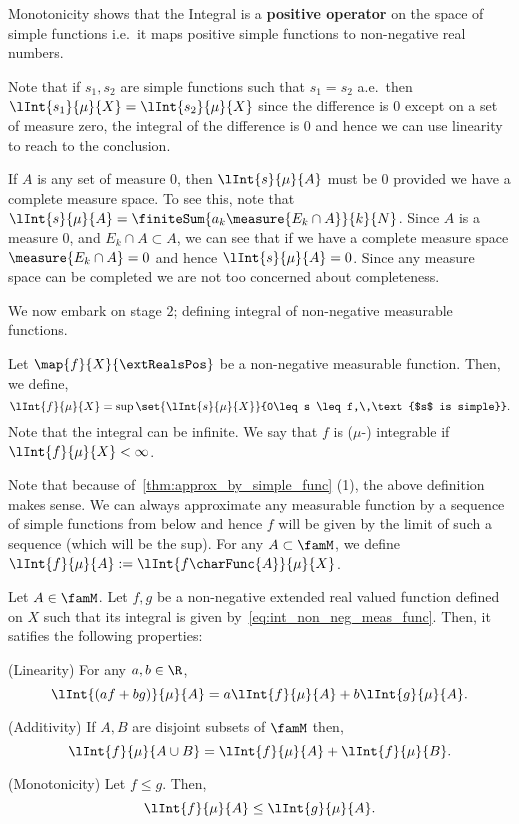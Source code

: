 Monotonicity shows that the Integral is a \textbf{positive operator} on the space of simple functions i.e.~it
maps positive simple functions to non-negative real numbers. 
\begin{Remark}\label{rmk:simple_func_meas_0}
    Note that if $s_1,s_2$ are simple functions such that $s_1 = s_2$ a.e.~then $\lInt{s_1}{\mu}{X} =
    \lInt{s_2}{\mu}{X}$ since the difference is $0$ except on a set of measure zero, 
    the integral of the difference is
    $0$ and hence we can use linearity to reach to the conclusion.

    If $A$ is any set of measure $0$, then $\lInt{s}{\mu}{A}$ must be $0$ provided we have a complete measure
    space. To see this, note that $\lInt{s}{\mu}{A} = \finiteSum{a_k\measure{E_k\cap A}}{k}{N}$. Since $A$ is
    a measure $0$, and $E_k \cap A \subset A$, we can see that if we have a complete measure space
    $\measure{E_k\cap A} = 0$ and hence $\lInt{s}{\mu}{A} = 0$. Since any measure space can be completed we
    are not too concerned about completeness.
\end{Remark}
We now embark on stage $2$; defining integral of non-negative measurable functions.
\begin{Definition}
    Let $\map{f}{X}{\extRealsPos}$ be a non-negative measurable function. Then, we define,
    \begin{equation}\label{eq:int_non_neg_meas_func}
	\lInt{f}{\mu}{X} = \sup\set{\lInt{s}{\mu}{X}}{0\leq s \leq f,\,\text{$s$ is simple}}.
    \end{equation}
    Note that the integral can be infinite. 
    We say that $f$ is ($\mu$-) integrable if $\lInt{f}{\mu}{X} < \infty$.
\end{Definition}
Note that because of~\ref{thm:approx_by_simple_func} (1), the above definition makes sense. We can always
approximate any measurable function by a sequence of simple functions from below and hence $f$ will be given
by the limit of such a sequence (which will be the sup).
For any $A \subset \famM$, we define\break{} 
$\lInt{f}{\mu}{A} := \lInt{f\charFunc{A}}{\mu}{X}$. 
\begin{Proposition}[name=Properties of the integral of non-negative measurable function]
    Let $A \in \famM$. Let $f,g$ be a non-negative extended real valued function defined on $X$ 
    such that its integral is given
    by~\ref{eq:int_non_neg_meas_func}. Then, it satifies the following properties:
    \begin{properties}
    \item
	(Linearity) For any $a,b \in \R$, 
	\[\lInt{(af + bg)}{\mu}{A} = a\lInt{f}{\mu}{A} + b\lInt{g}{\mu}{A}.\]
    \item
	(Additivity) If $A,B$ are disjoint subsets of $\famM$ then,
	\[\lInt{f}{\mu}{A\cup B} = \lInt{f}{\mu}{A} + \lInt{f}{\mu}{B}.\]
    \item
	(Monotonicity) Let $f\leq g$. Then,
	\[\lInt{f}{\mu}{A} \leq \lInt{g}{\mu}{A}.\]
    \end{properties}
\end{Proposition}
